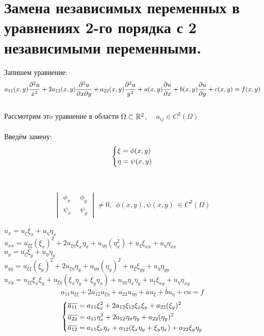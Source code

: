 \documentclass[../main.tex]{subfiles}
\begin{document}
\section{Замена независимых переменных в уравнениях 2-го порядка с 2 независимыми переменными.}
Запишем уравнение:
\begin{equation}\label{eq:1.6.1}
	a_{11}(x,y)\frac{\partial^2u}{x^2} + 2a_{12}(x,y)\frac{\partial^2u}{\partial x \partial y} + a_{22}(x,y)\frac{\partial^2u}{y^2} + a(x,y)\frac{\partial u}{\partial x} +b(x,y)\frac{\partial u}{\partial y}+c(x,y) = f(x,y) \end{equation} \\
Рассмотрим этo уравнение в области $\Omega \subset \mathbb{R}^2$, \ \ $a_{ij} \in C^2(\Omega)$ \\
\\ Введём замену:
$$\begin{dcases}\xi = \phi(x,y) \\ \eta = \psi(x,y)\end{dcases}$$
\\ \\
$$\begin{vmatrix}
		\phi_x \  & \ \phi_y
		\\
		\psi_x \  & \ \psi_y
	\end{vmatrix} \ne 0, \ \ \phi(x,y), \psi(x,y) \ \in C^2(\Omega)
$$ \\
$
	u_x = u_\xi\xi_{x}+u_\eta\eta_x
$  \\$
u_{xx} = u_{\xi\xi}(\xi_x)^2 + 2u_{\xi\eta}\xi_x\eta_x+u_{\eta\eta}(\eta_x^2)+u_\xi\xi_{xx}+u_\eta\eta_{xx}
$\\ $
u_y=u_\xi\xi_y+u_\eta\eta_y
$\\
$u_{yy}=u_{\xi\xi}(\xi_y)^2+2u_{\xi\eta}\eta_y+u_{\eta\eta}(\eta_y)^2+u_\xi\xi_{yy}+u_\eta\eta_{yy}$\\
$u_{xy}=u_{\xi\xi}\xi_{x}\xi_y+u_{\xi\eta}(\xi_x\eta_y+\xi_y\eta_x)+u_{\eta\eta}\eta_x\eta_y+u_\xi\xi_{xy}+u_\eta\eta_{xy}$ \\
	\begin{equation}
		\overline{a_{11}}u_{\xi\xi}+2\overline{a_{12}}u_{\xi\eta}+\overline{a_{22}}u_{\eta\eta}+\overline{a}u_{\xi}+\overline{b}u_\eta+cu=f
	\end{equation}
	\begin{equation}
		\begin{dcases}
			\overline{a_{11}}=a_{11}\xi_x^2+2a_{12}\xi_{12}\xi_x\xi_y+a_{22}(\xi_y)^2
			\\
			\overline{a_{22}}=a_{11}\eta_x^2+2a_{12}\eta_x\eta_y+a_{22}(\eta_y)^2
			\\
			\overline{a_{12}}=a_{11}\xi_x\eta_x+a_{12}(\xi_x\eta_y+\xi_y\eta_x)+a_{22}\xi_y\eta_y
		\end{dcases}
	\end{equation}
\end{document}
